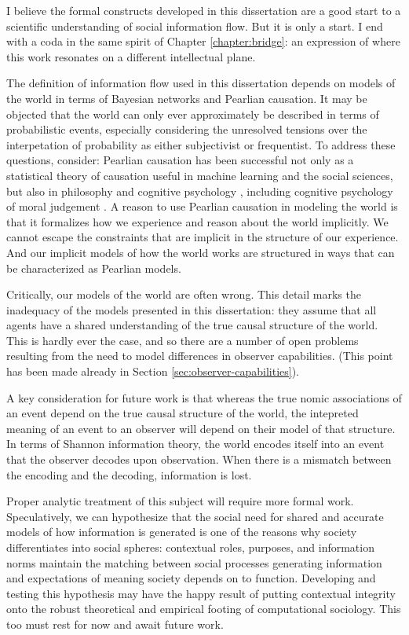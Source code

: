 \documentclass[../thesis.tex]{subfiles}
\begin{document}
 I believe the formal constructs developed in this
 dissertation are a good start to a scientific understanding
 of social information flow.
 But it is only a start.
 I end with a coda in the same spirit of
 Chapter \ref{chapter:bridge}:
 an expression of where this work resonates on a different
 intellectual plane.

 The definition of information flow used in this dissertation
 depends on models of the world in terms of Bayesian networks and
 Pearlian causation.
 It may be objected that the world can only ever approximately be
 described in terms of probabilistic events,
 especially considering the unresolved tensions over
 the interpetation of probability
 as either subjectivist or frequentist.
 To address these questions, consider:
 Pearlian causation has been successful not only as a statistical
 theory of causation useful in machine learning and the social
 sciences, but also in philosophy \citep{woodward2005making} and
 cognitive psychology \citep{sloman2005causal}, including
 cognitive psychology of moral judgement \citep{sloman2009causal}.
 A reason to use Pearlian causation
 in modeling the world is that it formalizes
 how we experience and reason about the world implicitly.
 We cannot escape the constraints that are implicit in the
 structure of our experience.
 And our implicit models of how the world works
 are structured in ways that can be characterized as Pearlian models.

 Critically, our models of the world are often wrong.
 This detail marks the inadequacy of the models presented
 in this dissertation: they assume that all agents have
 a shared understanding of the true causal structure of
 the world.
 This is hardly ever the case, and so there are a number of
 open problems resulting from the need to model
 differences in observer capabilities. (This point
 has been made already in Section \ref{sec:observer-capabilities}).

 A key consideration for future work is that whereas the
 true nomic associations
 of an event depend on the true causal structure of the world,
 the intepreted meaning of an event to an observer will depend
 on their model of that structure.
 In terms of Shannon information theory, the world encodes
 itself into an event that the observer decodes upon observation.
 When there is a mismatch between the encoding and the decoding,
 information is lost.

 Proper analytic treatment of this subject will require more
 formal work.
 Speculatively, we can hypothesize that the social need for
 shared and accurate models of how information is generated
 is one of the reasons why society differentiates into
 social spheres:
 contextual roles, purposes, and information norms maintain
 the matching between social processes generating information
 and expectations of meaning society depends on to function.
 Developing and testing this hypothesis may have the happy
 result of putting contextual integrity onto the robust
 theoretical and empirical footing of computational sociology.
 This too must rest for now and await future work.
\end{document}

